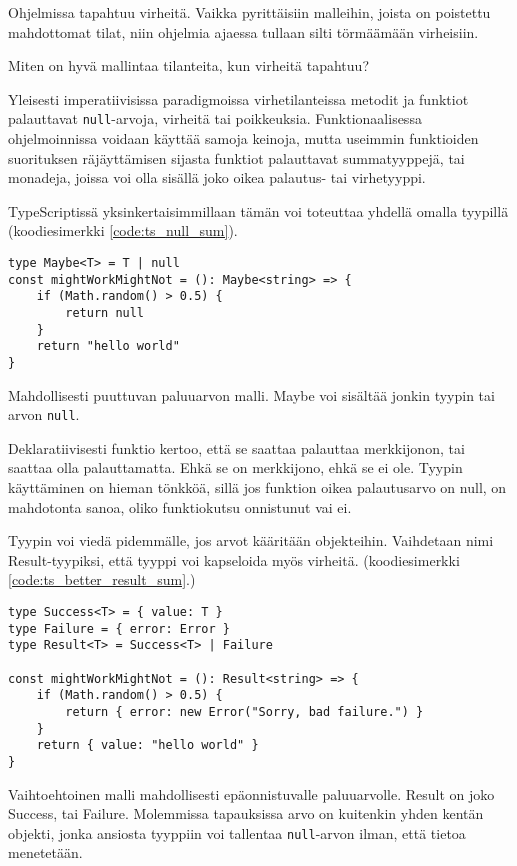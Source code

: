 Ohjelmissa tapahtuu virheitä. Vaikka pyrittäisiin malleihin, joista on poistettu mahdottomat tilat, niin ohjelmia ajaessa tullaan silti törmäämään virheisiin.

Miten on hyvä mallintaa tilanteita, kun virheitä tapahtuu?

Yleisesti imperatiivisissa paradigmoissa virhetilanteissa metodit ja funktiot palauttavat \texttt{null}-arvoja, virheitä tai poikkeuksia.
Funktionaalisessa ohjelmoinnissa voidaan käyttää samoja keinoja, mutta useimmin funktioiden suorituksen räjäyttämisen sijasta funktiot palauttavat summatyyppejä, tai monadeja, joissa voi olla sisällä joko oikea palautus- tai virhetyyppi.

TypeScriptissä yksinkertaisimmillaan tämän voi toteuttaa yhdellä omalla tyypillä (koodiesimerkki \ref{code:ts_null_sum}).

\begin{code}
    \begin{verbatim}
type Maybe<T> = T | null
const mightWorkMightNot = (): Maybe<string> => {
    if (Math.random() > 0.5) {
        return null
    }
    return "hello world"
}
    \end{verbatim}
    \caption{Mahdollisesti puuttuvan paluuarvon malli. Maybe voi sisältää jonkin tyypin tai arvon \texttt{null}.}
    \label{code:ts_null_sum}
\end{code}

Deklaratiivisesti funktio kertoo, että se saattaa palauttaa merkkijonon, tai saattaa olla palauttamatta. Ehkä se on merkkijono, ehkä se ei ole.
Tyypin käyttäminen on hieman tönkköä, sillä jos funktion oikea palautusarvo on null, on mahdotonta sanoa, oliko funktiokutsu onnistunut vai ei.

Tyypin voi viedä pidemmälle, jos arvot kääritään objekteihin. Vaihdetaan nimi Result-tyypiksi, että tyyppi voi kapseloida myös virheitä. (koodiesimerkki \ref{code:ts_better_result_sum}.)

\begin{code}
    \begin{verbatim}
type Success<T> = { value: T }
type Failure = { error: Error }
type Result<T> = Success<T> | Failure 

const mightWorkMightNot = (): Result<string> => {
    if (Math.random() > 0.5) {
        return { error: new Error("Sorry, bad failure.") }
    }
    return { value: "hello world" }
}
    \end{verbatim}
    \caption{Vaihtoehtoinen malli mahdollisesti epäonnistuvalle paluuarvolle. Result on joko Success, tai Failure. Molemmissa tapauksissa arvo on kuitenkin yhden kentän objekti, jonka ansiosta tyyppiin voi tallentaa \texttt{null}-arvon ilman, että tietoa menetetään.}
    \label{code:ts_better_result_sum}
\end{code}


